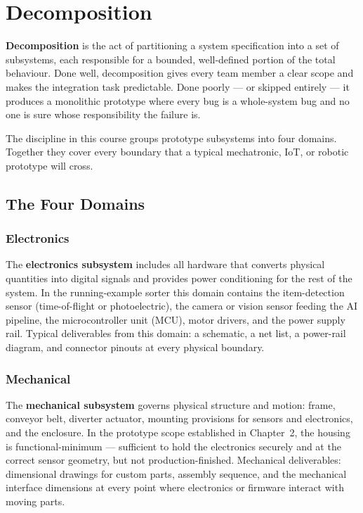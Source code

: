 \section{Decomposition}
\label{sec:ch5-decomp}

\textbf{Decomposition} is the act of partitioning a system specification into a set of subsystems, each responsible for a bounded, well-defined portion of the total behaviour.
Done well, decomposition gives every team member a clear scope and makes the integration task predictable.
Done poorly --- or skipped entirely --- it produces a monolithic prototype where every bug is a whole-system bug and no one is sure whose responsibility the failure is.

The discipline in this course groups prototype subsystems into four domains.
Together they cover every boundary that a typical mechatronic, IoT, or robotic prototype will cross.

\subsection{The Four Domains}
\label{subsec:ch5-four-domains}

\subsubsection{Electronics}
\label{subsubsec:ch5-electronics}

The \textbf{electronics subsystem} includes all hardware that converts physical quantities into digital signals and provides power conditioning for the rest of the system.
In the running-example sorter this domain contains the item-detection sensor (time-of-flight or photoelectric), the camera or vision sensor feeding the AI pipeline, the microcontroller unit (MCU), motor drivers, and the power supply rail.
Typical deliverables from this domain: a schematic, a net list, a power-rail diagram, and connector pinouts at every physical boundary.

\subsubsection{Mechanical}
\label{subsubsec:ch5-mechanical}

The \textbf{mechanical subsystem} governs physical structure and motion: frame, conveyor belt, diverter actuator, mounting provisions for sensors and electronics, and the enclosure.
In the prototype scope established in Chapter~2, the housing is functional-minimum --- sufficient to hold the electronics securely and at the correct sensor geometry, but not production-finished.
Mechanical deliverables: dimensional drawings for custom parts, assembly sequence, and the mechanical interface dimensions at every point where electronics or firmware interact with moving parts.

